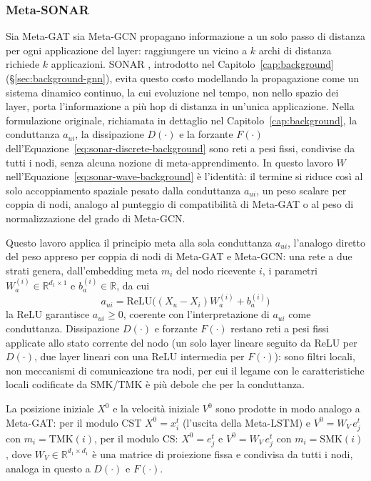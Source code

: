 \subsubsection{Meta-SONAR}
\label{subsec:meta-sonar}

Sia Meta-GAT sia Meta-GCN propagano informazione a un solo passo di
distanza per ogni applicazione del layer: raggiungere un vicino a $k$
archi di distanza richiede $k$ applicazioni. SONAR \citep{trenta2025sonar},
introdotto nel Capitolo~\ref{cap:background} (§\ref{sec:background-gnn}),
evita questo costo modellando la propagazione come un sistema dinamico
continuo, la cui evoluzione nel tempo, non nello spazio dei layer, porta
l'informazione a più hop di distanza in un'unica applicazione. Nella
formulazione originale, richiamata in dettaglio nel Capitolo~\ref{cap:background},
la conduttanza $a_{ui}$, la dissipazione $D(\cdot)$ e la forzante $F(\cdot)$
dell'Equazione~\ref{eq:sonar-discrete-background} sono reti a pesi fissi,
condivise da tutti i nodi, senza alcuna nozione di meta-apprendimento. In
questo lavoro $W$ nell'Equazione~\ref{eq:sonar-wave-background} è
l'identità: il termine si riduce così al solo accoppiamento spaziale
pesato dalla conduttanza $a_{ui}$, un peso scalare per coppia di nodi,
analogo al punteggio di compatibilità di Meta-GAT o al peso di
normalizzazione del grado di Meta-GCN.

Questo lavoro applica il principio meta alla sola conduttanza
$a_{ui}$, l'analogo diretto del peso appreso per coppia di nodi di Meta-GAT
e Meta-GCN: una rete a due strati genera, dall'embedding meta $m_i$ del nodo
ricevente $i$, i parametri $W_{a}^{(i)} \in \mathbb{R}^{d_1
    \times 1}$ e $b_{a}^{(i)} \in \mathbb{R}$, da cui
\begin{equation}
  a_{ui} = \mathrm{ReLU}\Big((X_u - X_i)W_{a}^{(i)} + b_{a}^{(i)}\Big)
  \label{eq:sonar-resistance}
\end{equation}
la ReLU garantisce $a_{ui} \geq 0$, coerente con l'interpretazione
di $a_{ui}$ come conduttanza. Dissipazione $D(\cdot)$ e forzante $F(\cdot)$
restano reti a pesi fissi applicate allo stato corrente del nodo (un solo
layer lineare seguito da ReLU per $D(\cdot)$, due layer lineari con una
ReLU intermedia per $F(\cdot)$): sono filtri locali, non meccanismi di
comunicazione tra nodi, per cui il legame con le caratteristiche locali
codificate da SMK/TMK è più debole che per la conduttanza.

La posizione iniziale $X^0$ e la velocità iniziale $V^0$ sono prodotte in modo analogo a Meta-GAT:
per il modulo CST $X^0=x_i^t$ (l'uscita della Meta-LSTM) e $V^0=W_V\,e_j^t$ con $m_i=\mathrm{TMK}(i)$,
per il modulo CS: $X^0=e_j^t$ e $V^0=W_V\,e_j^t$ con $m_i=\mathrm{SMK}(i)$,
dove $W_V \in \mathbb{R}^{d_1 \times d_1}$ è una matrice di proiezione
fissa e condivisa da tutti i nodi, analoga in questo a $D(\cdot)$ e
$F(\cdot)$.

